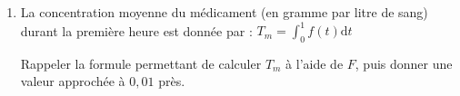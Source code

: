 \begin{exercice_cours}[\quad]{}
\begin{enumerate}
\begin{enumerate}
		\begin{blocvisiblex}[height=3]
{\quad}
\end{blocvisiblex}
	    
		
		\item La concentration moyenne du médicament (en gramme par litre de sang) durant la première heure est donnée par : $ {T_m = \int_0^1f(t)\text{d}t}$
		
		Rappeler la formule permettant de calculer $T_m$ à l'aide de $F$, puis donner une valeur approchée à $0,01$ près.    

\begin{blocvisiblex}[height=2]
{\quad}
\end{blocvisiblex}
	\end{enumerate}
\end{enumerate}
\end{exercice_cours}


